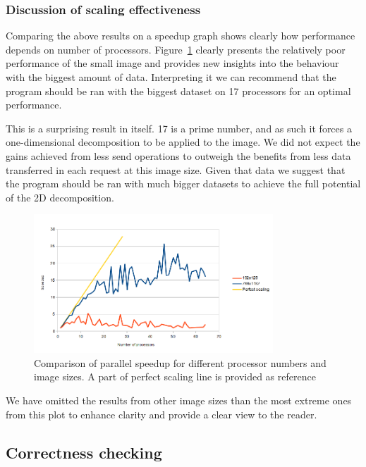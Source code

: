 \documentclass[11pt,a4paper]{article}
\begin{document}
\subsubsection{Discussion of scaling effectiveness}
Comparing the above results on a speedup graph shows clearly how performance depends on number of processors.
Figure~\ref{fig:speedup} clearly presents the relatively poor performance of the small image and provides new insights into the behaviour with the biggest amount of data.
Interpreting it we can recommend that the program should be ran with the biggest dataset on 17 processors for an optimal performance.

This is a surprising result in itself. 
17 is a prime number, and as such it forces a one-dimensional decomposition to be applied to the image.
We did not expect the gains achieved from less send operations to outweigh the benefits from less data transferred in each request at this image size.
Given that data we suggest that the program should be ran with much bigger datasets to achieve the full potential of the 2D decomposition.

\begin{figure}[h!]
    \begin{center}
        \includegraphics[width=0.8\textwidth]{speedup.png}
    \end{center}
    \caption{Comparison of parallel speedup for different processor numbers and image sizes. A part of perfect scaling line is provided as reference}\label{fig:speedup}
\end{figure}

We have omitted the results from other image sizes than the most extreme ones from this plot to enhance clarity and provide a clear view to the reader.

\subsection{Correctness checking}
\end{document}
